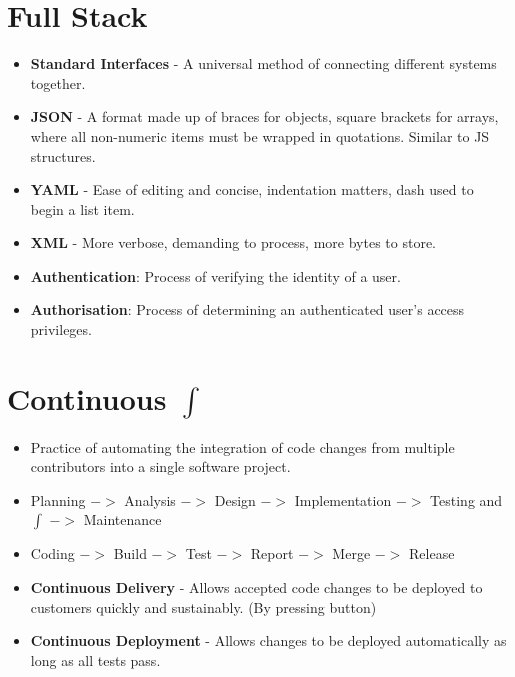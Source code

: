 \documentclass{article}
\begin{document}
\section{Full Stack}
    \begin{itemize}
        \renewcommand\labelitemi{--}
        \item \textbf{Standard Interfaces} - A universal method of connecting different systems together. 
        \item \textbf{JSON} - A format made up of braces for objects, square brackets for arrays, where all non-numeric items must be wrapped in quotations. Similar to JS structures.
        \item \textbf{YAML} - Ease of editing and concise, indentation matters, dash used to begin a list item.
        \item \textbf{XML} - More verbose, demanding to process, more bytes to store.
        \item \textbf{Authentication}: Process of verifying the identity of a user.
        \item \textbf{Authorisation}: Process of determining an authenticated user's access privileges.
    \end{itemize}
    
\section{Continuous $\int$}
    \begin{itemize}
        \renewcommand\labelitemi{--}
        \item Practice of automating the integration of code changes from multiple contributors into a single software project.
        \item Planning $->$ Analysis $->$ Design $->$ Implementation $->$ Testing and $\int$ $->$ Maintenance
        \item Coding $->$ Build $->$ Test $->$ Report $->$ Merge $->$ Release
        \item \textbf{Continuous Delivery} - Allows accepted code changes to be deployed to customers quickly and sustainably. (By pressing button)
        \item \textbf{Continuous Deployment} - Allows changes to be deployed automatically as long as all tests pass.
    \end{itemize}
\end{document}
